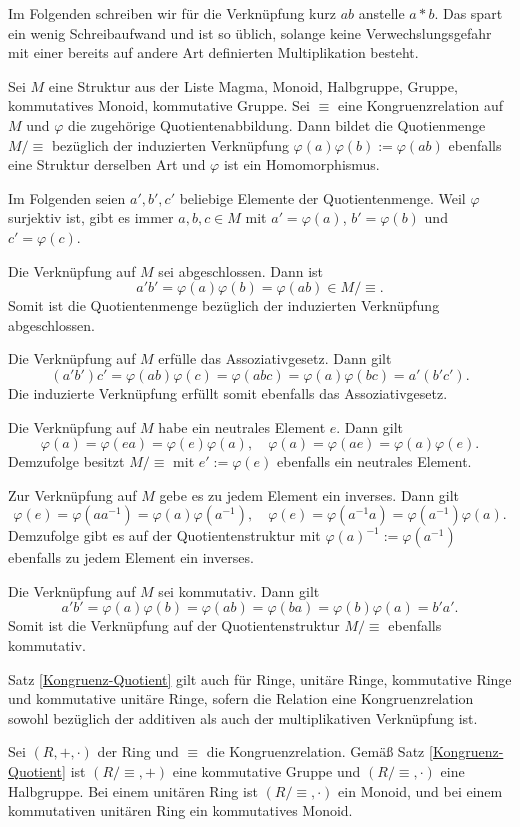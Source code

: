 Im Folgenden schreiben wir für die Verknüpfung kurz $ab$ anstelle
$a*b$. Das spart ein wenig Schreibaufwand und ist so üblich, solange
keine Verwechslungsgefahr mit einer bereits auf andere Art definierten
Multiplikation besteht.

\begin{Satz}\label{Kongruenz-Quotient}
Sei $M$ eine Struktur aus der Liste Magma, Monoid, Halbgruppe,
Gruppe, kommutatives Monoid, kommutative Gruppe. Sei $\equiv$ eine
Kongruenzrelation auf $M$ und $\varphi$ die zugehörige
Quotientenabbildung. Dann bildet die Quotienmenge $M/\equiv$
bezüglich der induzierten Verknüpfung $\varphi(a)\varphi(b):=\varphi(ab)$
ebenfalls eine Struktur derselben Art und $\varphi$ ist ein
Homomorphismus.
\end{Satz}
 Im Folgenden seien $a',b',c'$ beliebige Elemente
der Quotientenmenge. Weil $\varphi$ surjektiv ist, gibt es immer
$a,b,c\in M$ mit $a'=\varphi(a)$, $b'=\varphi(b)$ und $c'=\varphi(c)$.

Die Verknüpfung auf $M$ sei abgeschlossen. Dann ist
\[a'b' = \varphi(a)\varphi(b) = \varphi(ab)\in M/\equiv.\]
Somit ist die Quotientenmenge bezüglich der induzierten Verknüpfung
abgeschlossen.

Die Verknüpfung auf $M$ erfülle das Assoziativgesetz. Dann gilt
\[(a'b')c' = \varphi(ab)\varphi(c) = \varphi(abc)
= \varphi(a)\varphi(bc) = a'(b'c').\]
Die induzierte Verknüpfung erfüllt somit ebenfalls das
Assoziativgesetz.

Die Verknüpfung auf $M$ habe ein neutrales Element $e$. Dann gilt
\[\varphi(a)=\varphi(ea) = \varphi(e)\varphi(a),\quad
\varphi(a)=\varphi(ae)=\varphi(a)\varphi(e).\]
Demzufolge besitzt $M/\equiv$ mit $e':=\varphi(e)$ ebenfalls
ein neutrales Element.

Zur Verknüpfung auf $M$ gebe es zu jedem Element ein inverses. Dann gilt
\[\varphi(e) = \varphi(aa^{-1}) = \varphi(a)\varphi(a^{-1}),\quad
\varphi(e) = \varphi(a^{-1}a) = \varphi(a^{-1})\varphi(a).\]
Demzufolge gibt es auf der Quotientenstruktur mit
$\varphi(a)^{-1}:=\varphi(a^{-1})$ ebenfalls zu jedem Element
ein inverses.

Die Verknüpfung auf $M$ sei kommutativ. Dann gilt
\[a'b' = \varphi(a)\varphi(b) = \varphi(ab) = \varphi(ba)
= \varphi(b)\varphi(a) = b'a'.\]
Somit ist die Verknüpfung auf der Quotientenstruktur $M/\equiv$ ebenfalls
kommutativ.\,\qedsymbol

\begin{Satz}\label{Kongruenz-Ring-Quotient}
Satz \ref{Kongruenz-Quotient} gilt auch für Ringe, unitäre Ringe,
kommutative Ringe und kommutative unitäre Ringe, sofern die
Relation eine Kongruenzrelation sowohl bezüglich der additiven
als auch der multiplikativen Verknüpfung ist.
\end{Satz}
 Sei $(R,+,\cdot)$ der Ring und $\equiv$ die
Kongruenzrelation. Gemäß Satz \ref{Kongruenz-Quotient} ist
$(R/\equiv,+)$ eine kommutative Gruppe und $(R/\equiv,\cdot)$
eine Halbgruppe. Bei einem unitären Ring ist $(R/\equiv,\cdot)$
ein Monoid, und bei einem kommutativen unitären Ring ein
kommutatives Monoid.

